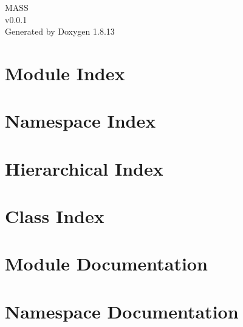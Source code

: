 \documentclass[twoside]{book}
\newcommand{\+}{\discretionary{\mbox{\scriptsize$\hookleftarrow$}}{}{}}
\newcommand{\clearemptydoublepage}{%
  \newpage{\pagestyle{empty}\cleardoublepage}%
}
\begin{document}
\hypersetup{pageanchor=false,
             bookmarksnumbered=true,
             pdfencoding=unicode
            }
\begin{titlepage}
\vspace*{7cm}
\begin{center}%
{\Large M\+A\+SS \\[1ex]\large v0.\+0.\+1 }\\
\vspace*{1cm}
{\large Generated by Doxygen 1.8.13}\\
\end{center}
\end{titlepage}
\clearemptydoublepage
{}
\tableofcontents
\clearemptydoublepage
{}
\hypersetup{pageanchor=true}

\chapter{Module Index}

\chapter{Namespace Index}

\chapter{Hierarchical Index}

\chapter{Class Index}

\chapter{Module Documentation}

\chapter{Namespace Documentation}


\end{document}
